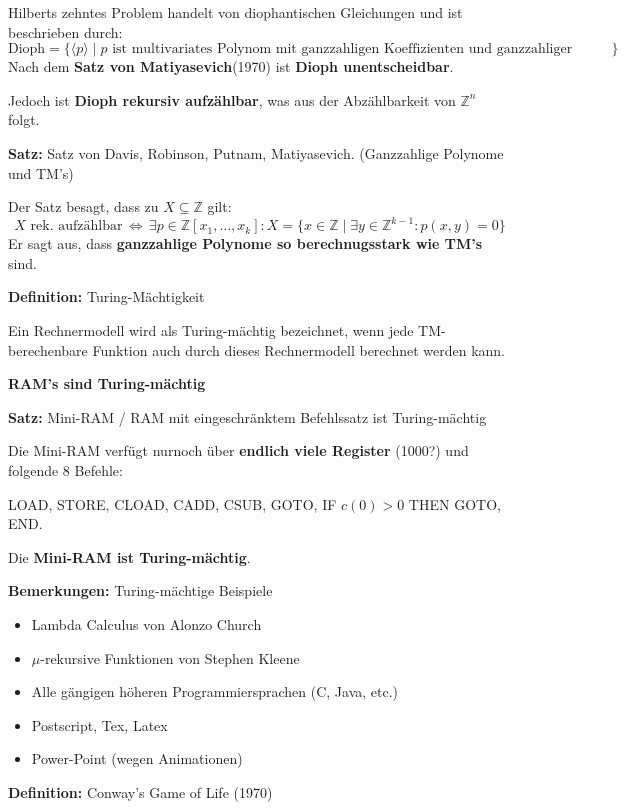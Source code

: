 \documentclass[a4paper,graphics,11pt]{article}
\newcommand{\godel}[1]{\langle #1 \rangle}
\newcommand{\Iff}[0]{\,\Longleftrightarrow\,}
\begin{document}
Hilberts zehntes Problem handelt von diophantischen Gleichungen und ist beschrieben durch:
$$
    \text{Dioph} =  \{\godel{p} \mid p \text{ ist multivariates Polynom mit ganzzahligen Koeffizienten und ganzzahliger Nullstelle}\}
$$
Nach dem \textbf{Satz von Matiyasevich}(1970) ist \textbf{Dioph unentscheidbar}.

Jedoch ist \textbf{Dioph rekursiv aufzählbar}, was aus der Abzählbarkeit von $\mathbb{Z}^n$ folgt.

\newpage

\textbf{Satz:} Satz von Davis, Robinson, Putnam, Matiyasevich. (Ganzzahlige Polynome und TM's)

Der Satz besagt, dass zu $X\subseteq \mathbb{Z}$ gilt:
$$
    X \text{ rek. aufzählbar} \Iff
    \exists p \in \mathbb{Z}[x_1,\dots,x_k] : X = \{x \in \mathbb{Z} \mid \exists y \in \mathbb{Z}^{k-1}: p(x,y) = 0\}
$$
Er sagt aus, dass \textbf{ganzzahlige Polynome so berechnugsstark wie TM's} sind.

\strut

\textbf{Definition:} Turing-Mächtigkeit

Ein Rechnermodell wird als Turing-mächtig bezeichnet, wenn jede TM-berechenbare Funktion
auch durch dieses Rechnermodell berechnet werden kann.

\textbf{RAM's sind Turing-mächtig}

\strut

\textbf{Satz:} Mini-RAM / RAM mit eingeschränktem Befehlssatz ist Turing-mächtig

Die Mini-RAM verfügt nurnoch über \textbf{endlich viele Register} (1000?) und folgende 8 Befehle:

LOAD, STORE, CLOAD, CADD, CSUB, GOTO, IF $c(0) > 0$ THEN GOTO, END.

Die \textbf{Mini-RAM ist Turing-mächtig}.

\textbf{Bemerkungen:} Turing-mächtige Beispiele
\begin{itemize}
    \item Lambda Calculus von Alonzo Church
    \item $\mu$-rekursive Funktionen von Stephen Kleene
    \item Alle gängigen höheren Programmiersprachen (C, Java, etc.)
    \item Postscript, Tex, Latex
    \item Power-Point (wegen Animationen)
\end{itemize}

\strut

\textbf{Definition:} Conway's Game of Life (1970)
\end{document}
